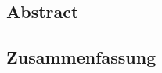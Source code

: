 \makeatletter

\begin{centering}
\textbf{\Large\@title} \\
\vspace{.1cm}
\small\@author \\
\end{centering}

\makeatother

\vfill
 
{\let\raggedsection\centering
\begin{centering}
\section*{Abstract }
\blindtext
\end{centering}
\vfill
\begin{german}
\section*{Zusammenfassung}
\begin{centering}
	\blindtext
\end{centering}
\end{german}}
\vfill
\blankpage